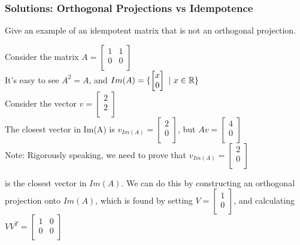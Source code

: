 \documentclass{beamer}
\newcommand\fonteight{\fontsize{8}{9.6}\selectfont}
\renewenvironment{enumerate}%
{\begin{list}{\arabic{enumi}.}%
      {\setlength{\leftmargin}{2.5em}%
       \setlength{\itemsep}{-\parsep}%
       \setlength{\topsep}{-\parskip}%
       \usecounter{enumi}}%
 }{\end{list}}
\begin{document}
\begin{frame}
\frametitle{Solutions: Orthogonal Projections vs Idempotence}
\begin{solution}
\begin{enumerate}
\item[3.] Give an example of an idempotent matrix that is not an orthogonal projection.  \\
\fonteight

Consider the matrix 
$A = \begin{bmatrix}
			1   & 1   \\
			0   & 0\\
		 \end{bmatrix}$\\
It's easy to see $A^2 = A$, and
$Im(A) = \{\begin{bmatrix}
x  \\
0  \\
\end{bmatrix}\ | \ x\in \mathbb{R}\}$\\
Consider the vector $v = \begin{bmatrix}
			2\\
			2\\
		 \end{bmatrix}$\\
The closest vector in Im(A) is $v_{Im(A)} = \begin{bmatrix}
			2\\
			0\\
		 \end{bmatrix}$, but $Av=\begin{bmatrix}
			4\\
			0\\
		 \end{bmatrix}$\\
\medskip
Note: Rigorously speaking, we need to prove that $v_{Im(A)} = \begin{bmatrix}
			2\\
			0\\
		 \end{bmatrix}$

is the closest vector in $Im(A)$. We can do this by constructing an orthogonal projection onto $Im(A)$,
which is found by setting $V =\begin{bmatrix}
			1\\
			0\\
\end{bmatrix}$, and calculating $VV^T = \begin{bmatrix}
			1   & 0   \\
			0   & 0\\
		 \end{bmatrix}$\\
\end{enumerate}
\end{solution}
\end{frame}
\end{document}
